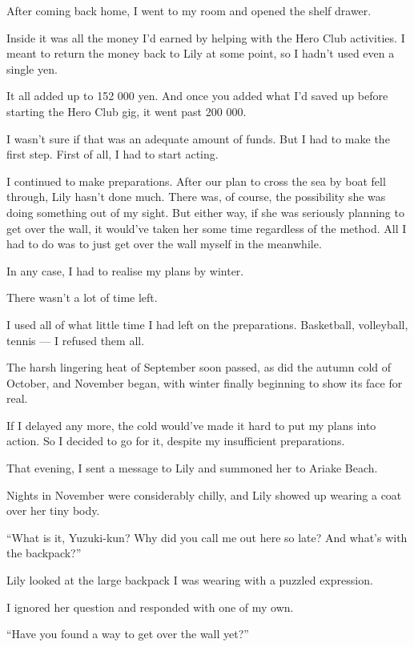 

After coming back home, I went to my room and opened the shelf drawer.

Inside it was all the money I'd earned by helping with the Hero Club activities. I meant to return the money back to Lily at some point, so I hadn't used even a single yen.

It all added up to 152 000 yen. And once you added what I'd saved up before starting the Hero Club gig, it went past 200 000.

I wasn't sure if that was an adequate amount of funds. But I had to make the first step. First of all, I had to start acting.

I continued to make preparations. After our plan to cross the sea by boat fell through, Lily hasn't done much. There was, of course, the possibility she was doing something out of my sight. But either way, if she was seriously planning to get over the wall, it would've taken her some time regardless of the method. All I had to do was to just get over the wall myself in the meanwhile.

In any case, I had to realise my plans by winter.

There wasn't a lot of time left.

I used all of what little time I had left on the preparations. Basketball, volleyball, tennis --- I refused them all.

The harsh lingering heat of September soon passed, as did the autumn cold of October, and November began, with winter finally beginning to show its face for real.

If I delayed any more, the cold would’ve made it hard to put my plans into action. So I decided to go for it, despite my insufficient preparations.

That evening, I sent a message to Lily and summoned her to Ariake Beach.

Nights in November were considerably chilly, and Lily showed up wearing a coat over her tiny body.

``What is it, Yuzuki-kun? Why did you call me out here so late? And what's with the backpack?''

Lily looked at the large backpack I was wearing with a puzzled expression.

I ignored her question and responded with one of my own.

``Have you found a way to get over the wall yet?''

